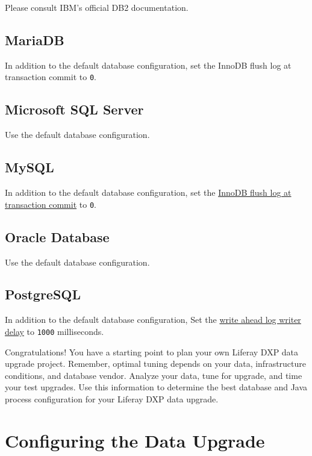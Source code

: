Please consult IBM's official DB2 documentation.

\section{MariaDB}\label{mariadb-1}

In addition to the default database configuration, set the InnoDB flush
log at transaction commit to \texttt{0}.

\section{Microsoft SQL Server}\label{microsoft-sql-server-1}

Use the default database configuration.

\section{MySQL}\label{mysql-1}

In addition to the default database configuration, set the
\href{https://dev.mysql.com/doc/refman/5.7/en/innodb-parameters.html\#sysvar_innodb_flush_log_at_trx_commit}{InnoDB
flush log at transaction commit} to \texttt{0}.

\section{Oracle Database}\label{oracle-database-1}

Use the default database configuration.

\section{PostgreSQL}\label{postgresql-1}

In addition to the default database configuration, Set the
\href{https://www.postgresql.org/docs/10/wal-async-commit.html}{write
ahead log writer delay} to \texttt{1000} milliseconds.

Congratulations! You have a starting point to plan your own Liferay DXP
data upgrade project. Remember, optimal tuning depends on your data,
infrastructure conditions, and database vendor. Analyze your data, tune
for upgrade, and time your test upgrades. Use this information to
determine the best database and Java process configuration for your
Liferay DXP data upgrade.

\chapter{Configuring the Data
Upgrade}\label{configuring-the-data-upgrade}

